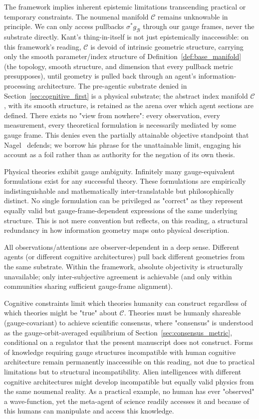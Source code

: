\documentclass[11pt]{article}
\begin{document}
The framework implies inherent epistemic limitations transcending practical or temporary constraints. The noumenal manifold $\mathcal{C}$ remains unknowable in principle. We can only access pullbacks $\sigma^* g_{\mathcal{B}}$ through our gauge frames, never the substrate directly. Kant's thing-in-itself is not just epistemically inaccessible: on this framework's reading, $\mathcal{C}$ is devoid of intrinsic geometric structure, carrying only the smooth parameter/index structure of Definition~\ref{def:base_manifold} (the topology, smooth structure, and dimension that every pullback metric presupposes), until geometry is pulled back through an agent's information-processing architecture. The pre-agentic substrate denied in Section~\ref{sec:cognitive_first} is a physical substrate; the abstract index manifold $\mathcal{C}$, with its smooth structure, is retained as the arena over which agent sections are defined. There exists no "view from nowhere": every observation, every measurement, every theoretical formulation is necessarily mediated by some gauge frame. This denies even the partially attainable objective standpoint that Nagel~\cite{Nagel1986} defends; we borrow his phrase for the unattainable limit, engaging his account as a foil rather than as authority for the negation of its own thesis.

Physical theories exhibit gauge ambiguity.  Infinitely many gauge-equivalent formulations exist for any successful theory. These formulations are empirically indistinguishable and mathematically inter-translatable but philosophically distinct. No single formulation can be privileged as "correct" as they represent equally valid but gauge-frame-dependent expressions of the same underlying structure. This is not mere convention but reflects, on this reading, a structural redundancy in how information geometry maps onto physical description.

All observations/attentions are observer-dependent in a deep sense. Different agents (or different cognitive architectures) pull back different geometries from the same substrate. Within the framework, absolute objectivity is structurally unavailable; only inter-subjective agreement is achievable (and only within communities sharing sufficient gauge-frame alignment).

Cognitive constraints limit which theories humanity can construct regardless of which theories might be "true" about $\mathcal{C}$. Theories must be humanly shareable (gauge-covariant) to achieve scientific consensus, where "consensus" is understood as the gauge-orbit-averaged equilibrium of Section~\ref{sec:consensus_metric}, conditional on a regulator that the present manuscript does not construct. Forms of knowledge requiring gauge structures incompatible with human cognitive architecture remain permanently inaccessible on this reading, not due to practical limitations but to structural incompatibility. Alien intelligences with different cognitive architectures might develop incompatible but equally valid physics from the same noumenal reality.  As a practical example, no human has ever "observed" a wave-function, yet the meta-agent of science readily accesses it and because of this humans can manipulate and access this knowledge.
\end{document}
